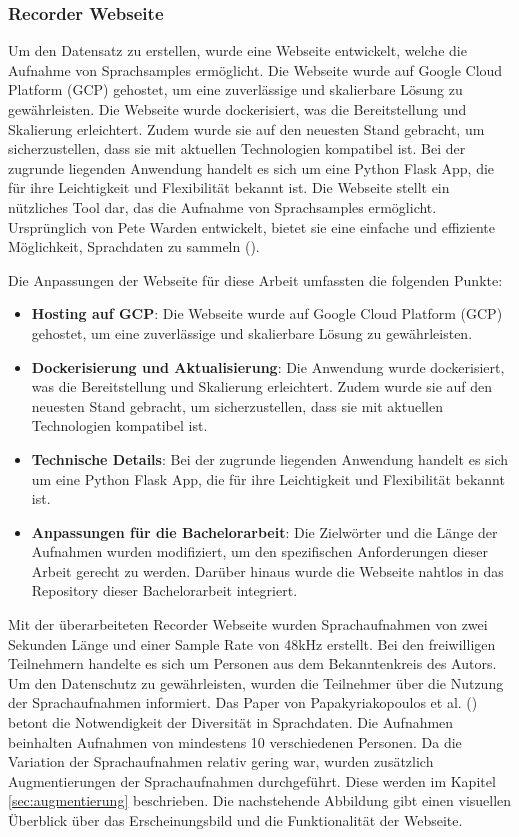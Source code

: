 \documentclass[11pt,a4paper]{article}
\begin{document}
\subsubsection{Recorder Webseite}
Um den Datensatz zu erstellen, wurde eine Webseite entwickelt, welche die Aufnahme von Sprachsamples 
ermöglicht. Die Webseite wurde auf Google Cloud Platform (GCP) gehostet, um eine zuverlässige und
skalierbare Lösung zu gewährleisten. Die Webseite wurde dockerisiert, was die Bereitstellung und 
Skalierung erleichtert. Zudem wurde sie auf den neuesten Stand gebracht, um sicherzustellen, dass 
sie mit aktuellen Technologien kompatibel ist. Bei der zugrunde liegenden Anwendung handelt es sich 
um eine Python Flask App, die für ihre Leichtigkeit und Flexibilität bekannt ist. Die Webseite 
stellt ein nützliches Tool dar, das die Aufnahme von Sprachsamples ermöglicht. Ursprünglich von 
Pete Warden entwickelt, bietet sie eine einfache und effiziente Möglichkeit, Sprachdaten zu sammeln 
(\cite{warden2018speech}).

\noindent \newline
Die Anpassungen der Webseite für diese Arbeit umfassten die folgenden Punkte:

\begin{itemize}
    \item \textbf{Hosting auf GCP}: Die Webseite wurde auf Google Cloud Platform (GCP) gehostet, um 
	eine zuverlässige und skalierbare Lösung zu gewährleisten.
    \item \textbf{Dockerisierung und Aktualisierung}: Die Anwendung wurde dockerisiert, was die 
	Bereitstellung und Skalierung erleichtert. Zudem wurde sie auf den neuesten Stand gebracht, um 
	sicherzustellen, dass sie mit aktuellen Technologien kompatibel ist.
    \item \textbf{Technische Details}: Bei der zugrunde liegenden Anwendung handelt es sich um eine 
	Python Flask App, die für ihre Leichtigkeit und Flexibilität bekannt ist.
    \item \textbf{Anpassungen für die Bachelorarbeit}: Die Zielwörter und die Länge der Aufnahmen 
	wurden modifiziert, um den spezifischen Anforderungen dieser Arbeit gerecht zu werden. Darüber 
	hinaus wurde die Webseite nahtlos in das Repository dieser Bachelorarbeit integriert.
\end{itemize}

\noindent \newline
Mit der überarbeiteten Recorder Webseite wurden Sprachaufnahmen von zwei Sekunden Länge und einer 
Sample Rate von 48kHz erstellt. Bei den freiwilligen Teilnehmern handelte es sich um Personen aus 
dem Bekanntenkreis des Autors. Um den Datenschutz zu gewährleisten, wurden die Teilnehmer über die 
Nutzung der Sprachaufnahmen informiert. Das Paper von Papakyriakopoulos et al. 
(\cite{papakyriakopoulos2023augmented}) betont die Notwendigkeit der Diversität in Sprachdaten. Die 
Aufnahmen beinhalten Aufnahmen von mindestens 10 verschiedenen Personen. Da die Variation der 
Sprachaufnahmen relativ gering war, wurden zusätzlich Augmentierungen der Sprachaufnahmen 
durchgeführt. Diese werden im Kapitel \ref{sec:augmentierung} beschrieben. Die nachstehende 
Abbildung gibt einen visuellen Überblick über das Erscheinungsbild und die Funktionalität der 
Webseite.
\end{document}
